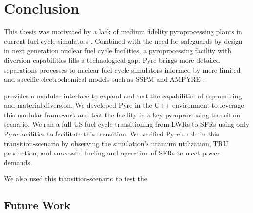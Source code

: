 \chapter{Conclusion}

This thesis was motivated by a lack of medium fidelity pyroprocessing plants in current fuel cycle simulators \cite{borrelli_approaches_2017}. Combined with 
the need for safeguards by design in next generation nuclear fuel cycle facilities, a pyroprocessing facility with diversion capabilities fills a technological gap.
Pyre brings more detailed separations processes to nuclear fuel cycle simulators informed by more limited and specific electrochemical models such as SSPM and AMPYRE \cite{maggos_update_2015}.

\Cyclus provides a modular interface to expand and test the capabilities of reprocessing and material diversion. We developed Pyre in the C++ \Cyclus environment to leverage this
modular framework and test the facility in a key pyroprocessing transition-scenario. We ran a full US fuel cycle transitioning from LWRs to SFRs using only Pyre facilities to facilitate
this transition. We verified Pyre's role in this transition-scenario by observing the simulation's uranium utilization, TRU production, and successful fueling and operation of SFRs to
meet power demands.

We also used this transition-scenario to test the 

\section{Future Work}